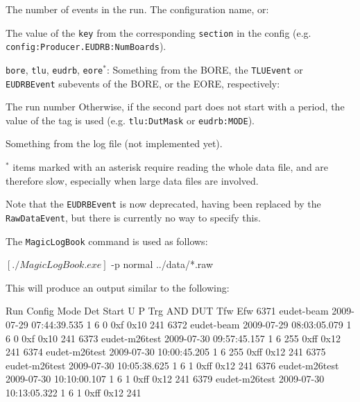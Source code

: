 \begin{mydescription}
   The number of events in the run.
   The configuration name, or:
  \begin{mydescription}
     The value of the \texttt{key} from the corresponding \texttt{section} in the config
    (e.g. \texttt{config:Producer.EUDRB:NumBoards}).
  \end{mydescription}
  \item{\texttt{bore}, \texttt{tlu}, \texttt{eudrb}, \texttt{eore}$^\ast$:} Something from the \gls{BORE},
  the \texttt{TLUEvent} or \texttt{EUDRBEvent} subevents of the \gls{BORE}, or the \gls{EORE}, respectively:
  \begin{mydescription}
     The run number
     Otherwise, if the second part does not start with a period, the value of the tag  is used
    (e.g. \texttt{tlu:DutMask} or \texttt{eudrb:MODE}).
  \end{mydescription}
   Something from the log file (not implemented yet).
\end{mydescription}

$^\ast$ items marked with an asterisk require reading the whole data file, and are therefore slow,
especially when large data files are involved.

Note that the \texttt{EUDRBEvent} is now deprecated, having been replaced by the \texttt{RawDataEvent},
but there is currently no way to specify this.

The \texttt{MagicLogBook} command is used as follows:

\begin{listing}[mybash]
$[./MagicLogBook.exe]$ -p normal ../data/*.raw
\end{listing}

This will produce an output similar to the following:
\begin{listing}[]
Run  Config     Mode Det Start                   U P Trg AND  DUT  Tfw Efw
6371 eudet-beam          2009-07-29 07:44:39.535 1 6   0 0xf  0x10 241
6372 eudet-beam          2009-07-29 08:03:05.079 1 6   0 0xf  0x10 241
6373 eudet-m26test       2009-07-30 09:57:45.157 1 6 255 0xff 0x12 241
6374 eudet-m26test       2009-07-30 10:00:45.205 1 6 255 0xff 0x12 241
6375 eudet-m26test       2009-07-30 10:05:38.625 1 6   1 0xff 0x12 241
6376 eudet-m26test       2009-07-30 10:10:00.107 1 6   1 0xff 0x12 241
6379 eudet-m26test       2009-07-30 10:13:05.322 1 6   1 0xff 0x12 241
\end{listing}

